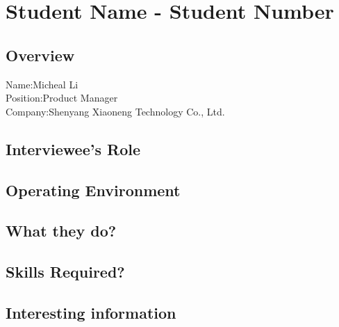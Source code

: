 \chapter{Student Name - Student Number}

\section{Overview}
\noindent Name:Micheal Li
\\
Position:Product Manager
\\
Company:Shenyang Xiaoneng Technology Co., Ltd.

\section{Interviewee's Role}

\section{Operating Environment}

\section{What they do?}

\section{Skills Required?}

\section{Interesting information}
